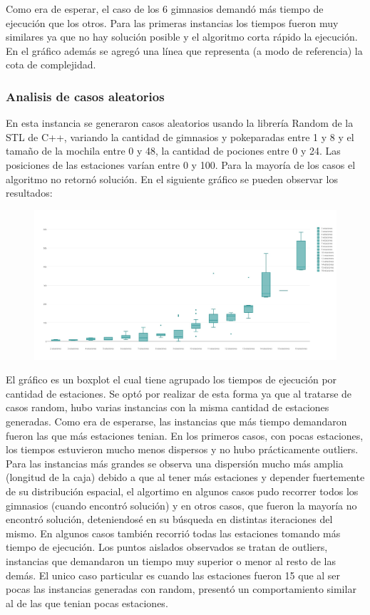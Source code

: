       Como era de esperar, el caso de los 6 gimnasios demandó más tiempo de ejecución que los otros. Para las primeras instancias los tiempos fueron muy similares ya que no hay solución posible y el algoritmo corta rápido la ejecución. En el gráfico además se agregó una línea que representa (a modo de referencia) la cota de complejidad.

      \subsubsection{Analisis de casos aleatorios}
      En esta instancia se generaron casos aleatorios usando la librería Random de la STL de C++, variando la cantidad de gimnasios y pokeparadas entre 1 y 8 y el tamaño de la mochila entre 0 y 48, la cantidad de pociones entre 0 y 24. Las posiciones de las estaciones varían entre 0 y 100. Para la mayoría de los casos el algoritmo no retornó solución.
      En el siguiente gráfico se pueden observar los resultados:

      \begin{figure}[H]
      \begin{center}
        \includegraphics[width=1.0\columnwidth]{imagenes/exp_random_ej2.jpeg}
        \caption{}
      \end{center}
  \end{figure}

     El gráfico es un boxplot el cual tiene agrupado los tiempos de ejecución por cantidad de estaciones. Se optó por realizar de esta forma ya que al tratarse de casos random, hubo varias instancias con la misma cantidad de estaciones generadas. Como era de esperarse, las instancias que más tiempo demandaron fueron las que más estaciones tenian. En los primeros casos, con pocas estaciones, los tiempos estuvieron mucho menos dispersos y no hubo prácticamente outliers. Para las instancias más grandes se observa una dispersión mucho más amplia (longitud de la caja) debido a que al tener más estaciones y depender fuertemente de su distribución espacial, el algortimo en algunos casos pudo recorrer todos los gimnasios (cuando encontró solución) y en otros casos, que fueron la mayoría no encontró solución, deteniendosé en su búsqueda en distintas iteraciones del mismo. En algunos casos también recorrió todas las estaciones tomando más tiempo de ejecución. Los puntos aislados observados se tratan de outliers, instancias que demandaron un tiempo muy superior o menor al resto de las demás. El unico caso particular es cuando las estaciones fueron 15 que al ser pocas las instancias generadas con random, presentó un comportamiento similar al de las que tenian pocas estaciones.